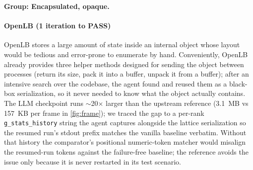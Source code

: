 \documentclass[conference]{IEEEtran}
\begin{document}
\smallskip\noindent\textbf{Group: Encapsulated, opaque.}

\paragraph{OpenLB (1 iteration to PASS)}
OpenLB stores a large amount of state inside an internal object whose layout would be tedious and error-prone to enumerate by hand. Conveniently, OpenLB already provides three helper methods designed for sending the object between processes (return its size, pack it into a buffer, unpack it from a buffer); after an intensive search over the codebase, the agent found and reused them as a black-box serialization, so it never needed to know what the object actually contains. The LLM checkpoint runs $\sim$20$\times$ larger than the upstream reference (3.1~MB vs 157~KB per frame in \autoref{fig:frame}); we traced the gap to a per-rank \texttt{g\_stats\_history} string the agent captures alongside the lattice serialization so the resumed run's stdout prefix matches the vanilla baseline verbatim. Without that history the comparator's positional numeric-token matcher would misalign the resumed-run tokens against the failure-free baseline; the reference avoids the issue only because it is never restarted in its test scenario.
\end{document}
